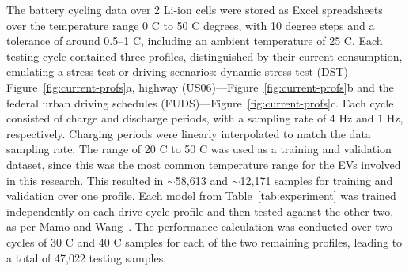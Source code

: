 %
The battery cycling data over 2 Li-ion cells were stored as Excel spreadsheets over the temperature range 0 \textdegree{}C to 50 \textdegree{}C degrees, with 10 degree steps and a tolerance of around 0.5--1 \textdegree{}C, including an ambient temperature of 25 \textdegree{}C.
Each testing cycle contained three profiles, distinguished by their current consumption, emulating a stress test or driving scenarios: dynamic stress test (DST)---Figure~\ref{fig:current-profs}a, highway (US06)---Figure~\ref{fig:current-profs}b and the federal urban driving schedules (FUDS)---Figure~\ref{fig:current-profs}c.
Each cycle consisted of charge and discharge periods, with a sampling rate of 4 Hz and 1 Hz, respectively.
Charging periods were linearly interpolated to match the data sampling rate.
The range of 20 \textdegree{}C to 50 \textdegree{}C was used as a training and validation dataset, since this was the most common temperature range for the EVs involved in this research.
This resulted in $\sim$58,613 and $\sim$12,171 samples for training and validation over one profile.
Each model from \mbox{Table~\ref{tab:experiment}} was trained independently on each drive cycle profile and then tested against the other two, as per Mamo and Wang~\cite{mamo_long_2020}.
The performance calculation was conducted over two cycles of 30 \textdegree{}C and 40 \textdegree{}C samples for each of the two remaining profiles, leading to a total of 47,022 testing samples.

